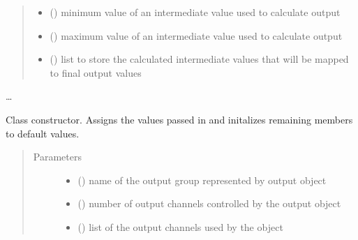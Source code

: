 \documentclass[letterpaper,10pt,english]{sphinxmanual}
\begin{document}
\begin{fulllineitems}
\begin{quote}
\begin{description}
\begin{itemize}
\item {} 
\sphinxAtStartPar
{}() \textendash{} minimum value of an intermediate 
value used to calculate output

\item {} 
\sphinxAtStartPar
{}() \textendash{} maximum value of an intermediate 
value used to calculate output

\item {} 
\sphinxAtStartPar
{}(\sphinxstyleemphasis{{[}int{]}}) \textendash{} list to store the calculated 
intermediate values that will be mapped to final output values

\end{itemize}

\end{description}\end{quote}

\sphinxAtStartPar
…

\sphinxAtStartPar
{}

\begin{fulllineitems}
\label{\detokenize{specific:NeckTiltOutput.NeckTiltOutput.__init__}}
\sphinxAtStartPar
Class constructor. Assigns the values passed in and initalizes remaining 
members to default values.
\begin{quote}\begin{description}
\item[{Parameters}] \leavevmode\begin{itemize}
\item {} 
\sphinxAtStartPar
{} () \textendash{} name of the output group represented by output object

\item {} 
\sphinxAtStartPar
{} () \textendash{} number of output channels controlled by the output 
object

\item {} 
\sphinxAtStartPar
{} (\sphinxstyleliteralemphasis{\sphinxupquote{{[}}}\sphinxstyleliteralemphasis{\sphinxupquote{{]}}}) \textendash{} list of the output channels used by the object


\end{itemize}
\end{description}
\end{quote}
\end{fulllineitems}
\end{fulllineitems}
\end{document}
